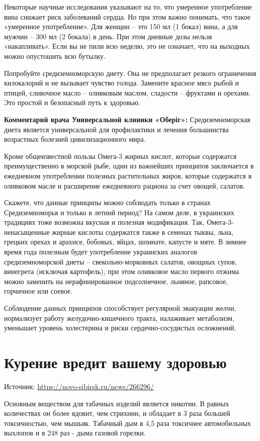 Некоторые научные исследования указывают на то, что умеренное употребление вина снижает риск заболеваний сердца. Но при этом важно понимать, что такое «умеренное употребление». Для женщин – это 150 мл (1 бокал) вина, а для мужчин – 300 мл (2 бокала) в день. При этом дневные дозы нельзя «накапливать». Если вы не пили всю неделю, это не означает, что на выходных можно опустошить всю бутылку.

Попробуйте средиземноморскую диету. Она не предполагает резкого ограничения килокалорий и не вызывает чувство голода. Замените красное мясо рыбой и птицей, сливочное масло – оливковым маслом, сладости – фруктами и орехами. Это простой и безопасный путь к здоровью.

\textbf{Комментарий врача Универсальной клиники «Оберіг»:} Средиземноморская диета является универсальной для профилактики и лечения большинства возрастных болезней цивилизационного мира.

Кроме общеизвестной пользы Омега-3 жирных кислот, которые содержатся преимущественно в морской рыбе, один из важнейших принципов заключается в ежедневном употреблении полезных растительных жиров, которые содержатся в оливковом масле и расширение ежедневного рациона за счет овощей, салатов.

Скажете, что данные принципы можно соблюдать только в странах Средиземноморья и только в летний период? На самом деле, в украинских традициях тоже возможна вкусная и полезная модификация. Так, Омега-3-ненасыщенные жирные кислоты содержатся также в семенах тыквы, льна, грецких орехах и арахисе, бобовых, яйцах, шпинате, капусте и мяте. В зимнее время года полезным будет употребление украинских аналогов средиземноморской диеты – свекольно-морковных салатов, овощных супов, винегрета (исключая картофель), при этом оливковое масло первого отжима можно заменить на нерафинированное подсолнечное, льняное, рапсовое, горчичное или соевое.


Соблюдение данных принципов способствует регулярной эвакуации желчи, нормализует работу желудочно-кишечного тракта, налаживает метаболизм, уменьшает уровень холестерина и риски сердечно-сосудистых осложнений.



\newpage
\section{Курение вредит вашему здоровью}
Источник: \url{https://novo-sibirsk.ru/news/266296/}

Основным веществом для табачных изделий является никотин. В равных количествах он более ядовит, чем стрихнин, и обладает в 3 раза большей токсичностью, чем мышьяк. Табачный дым в 4,5 раза токсичнее автомобильных выхлопов и в 248 раз - дыма газовой горелки.


